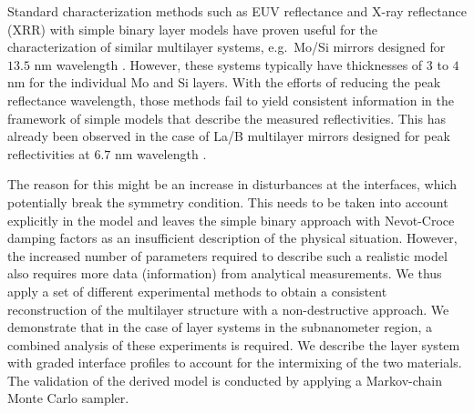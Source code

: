 Standard characterization methods such as EUV reflectance and X-ray reflectance 
(XRR) with simple binary layer models have proven useful for the 
characterization of similar multilayer systems, e.g.~Mo/Si mirrors designed for 
$13.5$ nm wavelength \cite{lim_fabrication_2001, bajt_investigation_2001, braun_mo/si_2002}. However, these systems typically have 
thicknesses of $3$ to $4$ nm for the individual Mo and Si layers. With the 
efforts of reducing the peak reflectance wavelength, those methods fail to 
yield consistent information in the framework of simple models that describe the measured 
reflectivities. This has already been observed in the case of La/B multilayer 
mirrors designed for peak reflectivities at $6.7$ nm wavelength 
\cite{yakunin_combined_2014}.

The reason for this might be an increase in disturbances at the interfaces, 
which potentially break the symmetry condition. This needs to be taken into 
account explicitly in the model and leaves the simple binary approach with 
Nevot-Croce damping factors as an insufficient description of the physical 
situation. However, the increased number of parameters required to describe 
such a realistic model also requires more data (information) from analytical 
measurements. We thus apply a set of different experimental methods to obtain a 
consistent reconstruction of the multilayer structure with a non-destructive 
approach. We demonstrate that in the case of layer systems in the subnanometer 
region, a combined analysis of these experiments is required. We describe the 
layer system with graded interface profiles to account for the intermixing of 
the two materials. The validation of the derived model is conducted by applying 
a Markov-chain Monte Carlo sampler.